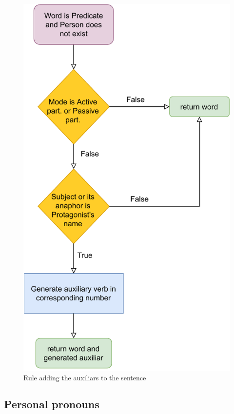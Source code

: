 \begin{figure}[!htbp]
\includegraphics[]{data/Erich-Auxverb-Rule.pdf}
\caption{Rule adding the auxiliars to the sentence}
\label{fig:erich-auxverb-rule}
\end{figure}

\subsection{Personal pronouns}


